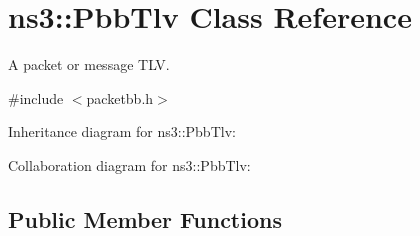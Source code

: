 \hypertarget{classns3_1_1PbbTlv}{}\section{ns3\+:\+:Pbb\+Tlv Class Reference}
\label{classns3_1_1PbbTlv}


A packet or message T\+LV.  




{\ttfamily \#include $<$packetbb.\+h$>$}



Inheritance diagram for ns3\+:\+:Pbb\+Tlv\+:


Collaboration diagram for ns3\+:\+:Pbb\+Tlv\+:
\subsection*{Public Member Functions}
